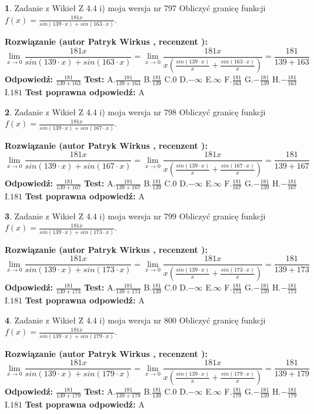 \documentclass[12pt, a4paper]{article}
\theoremstyle{definition} %
\newtheorem{zad}{}
\newcommand{\zadStart}[1]{\begin{zad}#1\newline}
\newcommand{\zadStop}{\end{zad}}
\newcommand{\rozwStart}[2]{\noindent \textbf{Rozwiązanie (autor #1 , recenzent #2): }\newline}
\newcommand{\rozwStop}{\newline}
\newcommand{\odpStart}{\noindent \textbf{Odpowiedź:}\newline}
\newcommand{\odpStop}{\newline}
\newcommand{\testStart}{\noindent \textbf{Test:}\newline}
\newcommand{\testStop}{\newline}
\newcommand{\kluczStart}{\noindent \textbf{Test poprawna odpowiedź:}\newline}
\newcommand{\kluczStop}{\newline}
\begin{document}
\zadStart{Zadanie z Wikieł Z 4.4 i) moja wersja nr 797}
Obliczyć granicę funkcji $f(x)=\frac{181x}{sin(139\cdot x) +sin(163\cdot x)}$.
\zadStop
\rozwStart{Patryk Wirkus}{}
$$\lim\limits_{x\to 0}\frac{181x}{sin(139\cdot x) +sin(163\cdot x)}=\lim\limits_{x\to 0}\frac{181x}{x(\frac{sin(139\cdot x)}{x}+\frac{sin(163\cdot x)}{x})}=\frac{181}{139+163}$$
\rozwStop
\odpStart
$\frac{181}{139+163}$
\odpStop
\testStart
A.$\frac{181}{139+163}$
B.$\frac{181}{139}$
C.$0$
D.$-\infty$
E.$\infty$
F.$\frac{181}{163}$
G.$-\frac{181}{139}$
H.$-\frac{181}{163}$
I.$181$
\testStop
\kluczStart
A
\kluczStop



\zadStart{Zadanie z Wikieł Z 4.4 i) moja wersja nr 798}
Obliczyć granicę funkcji $f(x)=\frac{181x}{sin(139\cdot x) +sin(167\cdot x)}$.
\zadStop
\rozwStart{Patryk Wirkus}{}
$$\lim\limits_{x\to 0}\frac{181x}{sin(139\cdot x) +sin(167\cdot x)}=\lim\limits_{x\to 0}\frac{181x}{x(\frac{sin(139\cdot x)}{x}+\frac{sin(167\cdot x)}{x})}=\frac{181}{139+167}$$
\rozwStop
\odpStart
$\frac{181}{139+167}$
\odpStop
\testStart
A.$\frac{181}{139+167}$
B.$\frac{181}{139}$
C.$0$
D.$-\infty$
E.$\infty$
F.$\frac{181}{167}$
G.$-\frac{181}{139}$
H.$-\frac{181}{167}$
I.$181$
\testStop
\kluczStart
A
\kluczStop



\zadStart{Zadanie z Wikieł Z 4.4 i) moja wersja nr 799}
Obliczyć granicę funkcji $f(x)=\frac{181x}{sin(139\cdot x) +sin(173\cdot x)}$.
\zadStop
\rozwStart{Patryk Wirkus}{}
$$\lim\limits_{x\to 0}\frac{181x}{sin(139\cdot x) +sin(173\cdot x)}=\lim\limits_{x\to 0}\frac{181x}{x(\frac{sin(139\cdot x)}{x}+\frac{sin(173\cdot x)}{x})}=\frac{181}{139+173}$$
\rozwStop
\odpStart
$\frac{181}{139+173}$
\odpStop
\testStart
A.$\frac{181}{139+173}$
B.$\frac{181}{139}$
C.$0$
D.$-\infty$
E.$\infty$
F.$\frac{181}{173}$
G.$-\frac{181}{139}$
H.$-\frac{181}{173}$
I.$181$
\testStop
\kluczStart
A
\kluczStop



\zadStart{Zadanie z Wikieł Z 4.4 i) moja wersja nr 800}
Obliczyć granicę funkcji $f(x)=\frac{181x}{sin(139\cdot x) +sin(179\cdot x)}$.
\zadStop
\rozwStart{Patryk Wirkus}{}
$$\lim\limits_{x\to 0}\frac{181x}{sin(139\cdot x) +sin(179\cdot x)}=\lim\limits_{x\to 0}\frac{181x}{x(\frac{sin(139\cdot x)}{x}+\frac{sin(179\cdot x)}{x})}=\frac{181}{139+179}$$
\rozwStop
\odpStart
$\frac{181}{139+179}$
\odpStop
\testStart
A.$\frac{181}{139+179}$
B.$\frac{181}{139}$
C.$0$
D.$-\infty$
E.$\infty$
F.$\frac{181}{179}$
G.$-\frac{181}{139}$
H.$-\frac{181}{179}$
I.$181$
\testStop
\kluczStart
A
\kluczStop
\end{document}
